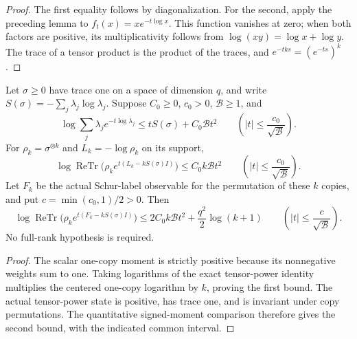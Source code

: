 \begin{proof}
\leanok
The first equality follows by diagonalization. For the second, apply the
preceding lemma to $f_t(x)=x e^{-t\log x}$. This function vanishes at zero;
when both factors are positive, its multiplicativity follows from
$\log(xy)=\log x+\log y$. The trace of a tensor product is the product
of the traces, and $e^{-tks}=(e^{-ts})^k$.
\end{proof}

\begin{theorem}
\label{thm:schur-label-iid-mgf}
\leanok
Let $\sigma\ge0$ have trace one on a space of dimension $q$, and write
$S(\sigma)=-\sum_j\lambda_j\log\lambda_j$. Suppose $C_0\ge0$,
$c_0>0$, $\mathcal B\ge1$, and
\[
 \log\sum_j\lambda_j e^{-t\log\lambda_j}
 \le tS(\sigma)+C_0\mathcal B t^2
 \qquad\left(|t|\le\frac{c_0}{\sqrt{\mathcal B}}\right).
\]
For $\rho_k=\sigma^{\otimes k}$ and $L_k=-\log\rho_k$ on its support,
\[
 \log\operatorname{ReTr}\bigl(\rho_k e^{t(L_k-kS(\sigma)I)}\bigr)
 \le C_0k\mathcal B t^2
 \qquad\left(|t|\le\frac{c_0}{\sqrt{\mathcal B}}\right).
\]
Let $F_k$ be the actual Schur-label observable for the permutation of these
$k$ copies, and put $c=\min(c_0,1)/2>0$. Then
\[
 \log\operatorname{ReTr}\bigl(\rho_k e^{t(F_k-kS(\sigma)I)}\bigr)
 \le 2C_0k\mathcal B t^2+\frac{q^2}{2}\log(k+1)
 \qquad\left(|t|\le\frac{c}{\sqrt{\mathcal B}}\right).
\]
No full-rank hypothesis is required.
\end{theorem}

\begin{proof}
\leanok
The scalar one-copy moment is strictly positive because its nonnegative
weights sum to one. Taking logarithms of the exact tensor-power identity
multiplies the centered one-copy logarithm by $k$, proving the first bound.
The actual tensor-power state is positive, has trace one, and is invariant
under copy permutations. The quantitative signed-moment comparison therefore
gives the second bound, with the indicated common interval.
\end{proof}
